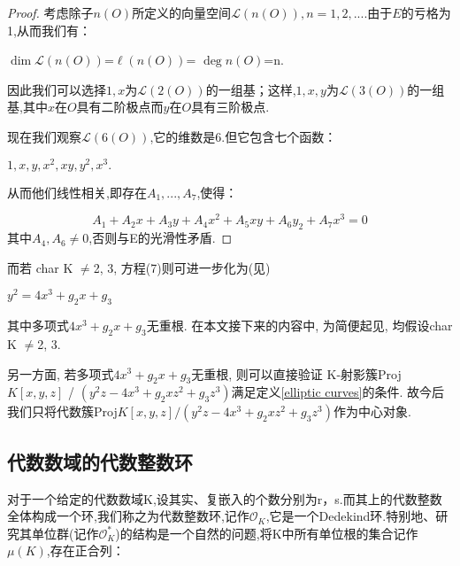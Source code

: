 \documentclass[11pt]{ctexart}
\DeclareMathOperator{\Dim}{dim}
\DeclareMathOperator{\Deg}{deg}
\begin{document}
\begin{proof}
考虑除子$n(O)$所定义的向量空间$\mathcal{L}(n(O))$$,n=1,2,...$.由于$E$的亏格为1,从而我们有：
\begin{center}
    $\Dim \mathcal{L}(n(O))$=$\ell(n(O))$= $\Deg n(O)$=n.
\end{center}
因此我们可以选择{$1,x$}为$\mathcal{L}(2(O))$的一组基；这样,{$1,x,y$}为$\mathcal{L}(3(O))$的一组基,其中$x$在$O$具有二阶极点而$y$在$O$具有三阶极点.

\noindent 现在我们观察$\mathcal{L}(6(O))$,它的维数是6.但它包含七个函数：

\begin{center}
   $ 1,x,y,x^2,xy,y^2,x^3.$
\end{center}

\noindent 从而他们线性相关,即存在$A_1,...,A_7$,使得：

\begin{equation}
    A_1+A_2x+A_3y+A_4x^2+A_5xy+A_6y_2+A_7x^3=0
\end{equation}
其中$A_4,A_6 \neq 0$,否则与E的光滑性矛盾.
\end{proof}
\noindent 而若 char K $\neq $2, 3, 方程(7)则可进一步化为(见\cite{GTM106})
\begin{center}
    $ y^2=4x^3+g_2x+g_3$
\end{center}
 
\noindent 其中多项式$4x^3+g_2x+g_3$无重根. 在本文接下来的内容中, 为简便起见, 均假设char K $\neq $2, 3.

另一方面, 若多项式$4x^3+g_2x+g_3$无重根, 则可以直接验证 K-射影簇Proj $K[x, y, z]$ / $(y^2z-4x^3+g_2xz^2+g_3z^3)$满足定义\ref{elliptic curves}的条件. 故今后我们只将代数簇Proj$K[x, y, z]/(y^2z-4x^3+g_2xz^2+g_3z^3)$\label{ec}作为中心对象.

\subsection{代数数域的代数整数环}
对于一个给定的代数数域K,设其实、复嵌入的个数分别为r，s.而其上的代数整数全体构成一个环,我们称之为代数整数环,记作$\mathcal{O}_K$,它是一个Dedekind环.特别地、研究其单位群(记作$\mathcal{O}_K^{*}$)的结构是一个自然的问题,将K中所有单位根的集合记作$\mu(K)$,存在正合列：
\end{document}

